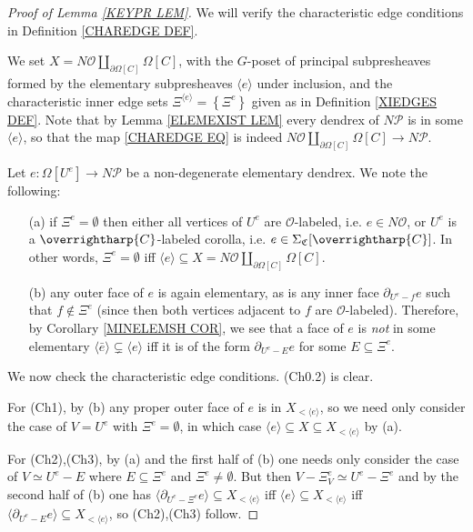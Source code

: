 \documentclass[a4paper,10pt
,draft
]{article}%
\numberwithin{equation}{section}
\numberwithin{figure}{section}
\theoremstyle{definition} %
\newcommand{\vect}[1]{\text{\overrightharp{\ensuremath{#1}}}}
\renewcommand{\O}{\ensuremath{\mathcal O}}
\renewcommand{\P}{\ensuremath{\mathcal P}}
\newcommand{\1}{\ensuremath{\mathbbm 1}}%
\begin{document}
\begin{proof}[Proof of Lemma \ref{KEYPR LEM}]
	We will verify the characteristic edge conditions in Definition \ref{CHAREDGE DEF}.

	We set $X = N \mathcal{O} \amalg_{\partial \Omega[C]} \Omega[C]$, 
	with the $G$-poset of principal subpresheaves formed by the 
	elementary subpresheaves 
	$\langle e \rangle$
	under inclusion, and the characteristic inner edge sets
	$\Xi^{\langle e \rangle} = \left\{\Xi^{e}\right\}$ given as in Definition \ref{XIEDGES DEF}.
	Note that by Lemma \ref{ELEMEXIST LEM}
	every dendrex of $N \mathcal{P}$ is in some 
	$\langle e \rangle$, so that the map
	\eqref{CHAREDGE EQ} is indeed
	$N \mathcal{O} \amalg_{\partial \Omega[C]} \Omega[C]
	\to N \mathcal{P}$.
	
	Let $e\colon \Omega[U^e] \to N \mathcal{P}$
	be a non-degenerate elementary dendrex. We note the following: 
	\begin{itemize}
		\item[(a)] if $\Xi^e = \emptyset$ then 
		either all vertices of $U^e$ are $\O$-labeled, i.e. $e \in N \mathcal{O}$, 
		or $U^e$ is a $\vect{C}$-labeled corolla, 
		i.e. $e \in \Sigma_{\mathfrak{C}}[\vect{C}]$.
		In other words, $\Xi^e = \emptyset$ iff 
		$\langle e \rangle \subseteq X = N \mathcal{O} \amalg_{\partial \Omega[C]} \Omega[C]$.
		\item[(b)] any outer face of $e$ is again elementary,
		as is any inner face $\partial_{U^e-f} e$ such that $f \not \in \Xi^e$
		(since then both vertices adjacent to $f$ are $\O$-labeled).
		Therefore, by Corollary \ref{MINELEMSH COR},
		we see that a face of $e$ is \emph{not} in
		some elementary $\langle \bar{e} \rangle \subsetneq \langle e \rangle$
		iff it is of the form
		$\partial_{U^e - E} e$
		for some $E \subseteq \Xi^e$.
	\end{itemize}

	We now check the characteristic edge conditions. (Ch0.2) is clear.
	
	For (Ch1), by (b) any proper outer face of $e$ is in $X_{<\langle e\rangle}$, so we need only consider the case of
	$V=U^e$ with $\Xi^e=\emptyset$, in which case
	$\langle e \rangle \subseteq X \subseteq X_{<\langle e\rangle}$ by (a).
	
	For (Ch2),(Ch3), by (a) and the first half of (b) one needs only consider the case of
	$V \simeq U^e - E$ where $E \subseteq \Xi^e$ and $\Xi^e \neq \emptyset$.
	But then
	$V - \Xi^e_V \simeq U^e- \Xi^e$
	and by the second half of (b)
	one has
	$\langle \partial_{U^e-\Xi^e}e \rangle \subseteq  X_{<\langle e\rangle}$
	iff
	$\langle e \rangle \subseteq  X_{<\langle e\rangle}$
	iff
	$\langle \partial_{U^e-E}e \rangle \subseteq  X_{<\langle e\rangle}$,
	so (Ch2),(Ch3) follow.
	

\end{proof}
\end{document}
